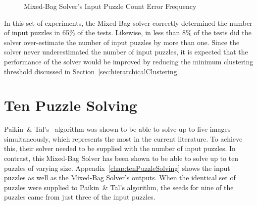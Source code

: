 \begin{figure}
\begin{center}
\end{center}
\caption{Mixed-Bag Solver's Input Puzzle Count Error Frequency}
\label{fig:inputPuzzleCountErrorFrequency}
\end{figure}

In this set of experiments, the Mixed-Bag solver correctly determined the number of input puzzles in 65\% of the tests.  Likewise, in less than 8\% of the tests did the solver over-estimate the number of input puzzles by more than one.  Since the solver never underestimated the number of input puzzles, it is expected that the performance of the solver would be improved by reducing the minimum clustering threshold discussed in Section~\ref{sec:hierarchicalClustering}. 

\section{Ten Puzzle Solving}

Paikin~\& Tal's~\cite{paikin2015} algorithm was shown to be able to solve up to five images simultaneously, which represents the most in the current literature.  To achieve this, their solver needed to be supplied with the number of input puzzles.  In contrast, this Mixed-Bag Solver has been shown to be able to solve up to ten puzzles of varying size.  Appendix~\ref{chap:tenPuzzleSolving} shows the input puzzles as well as the Mixed-Bag Solver's outputs. When the identical set of puzzles were supplied to Paikin~\& Tal's algorithm, the seeds for nine of the puzzles came from just three of the input puzzles.  

